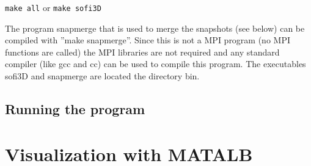 \documentclass{hitec}
\begin{document}
 \lstinline{make all}
or
 \lstinline{make sofi3D}


The program snapmerge that is used to merge the snapshots (see below) can be compiled with ''make snapmerge''. Since this is not a MPI program (no MPI functions are called) the MPI libraries are not required and any standard compiler (like gcc and cc) can be used to compile this program. The executables sofi3D and snapmerge are located the directory bin.

\subsection{Running the program}\label{compexec1}

\section{Visualization with MATALB} \label{visual}






 






\end{document}
